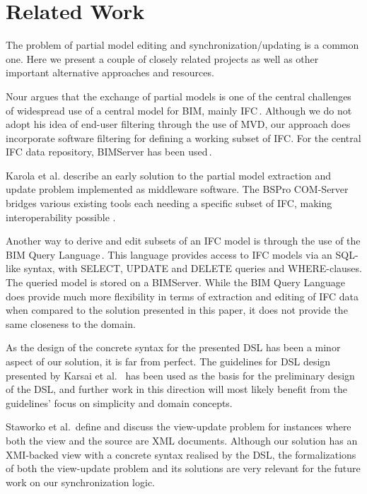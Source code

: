 \section{Related Work}
The problem of partial model editing and synchronization/updating is a common one. Here we present a couple of closely related projects as well as other important alternative approaches and resources.

Nour argues that the exchange of partial models is one of the central challenges of widespread use of a central model for BIM, mainly IFC\,\cite{nour08}. Although we do not adopt his idea of end-user filtering through the use of MVD, our approach does incorporate software filtering for defining a working subset of IFC. For the central IFC data repository, BIMServer has been used\,\cite{beetz10}.

Karola et al. describe an early solution to the partial model extraction and update problem implemented as middleware software. The BSPro COM-Server bridges various existing tools each needing a specific subset of IFC, making interoperability possible \cite{karola02}.

Another way to derive and edit subsets of an IFC model is through the use of the BIM Query Language\,\cite{mazairac10}. This language provides access to IFC models via an SQL-like syntax, with SELECT, UPDATE and DELETE queries and WHERE-clauses. The queried model is stored on a BIMServer. While the BIM Query Language does provide much more flexibility in terms of extraction and editing of IFC data when compared to the solution presented in this paper, it does not provide the same closeness to the domain.

As the design of the concrete syntax for the presented DSL has been a minor aspect of our solution, it is far from perfect. The guidelines for DSL design presented by Karsai et al. \,\cite{karsai09} has been used as the basis for the preliminary design of the DSL, and further work in this direction will most likely benefit from the guidelines' focus on simplicity and domain concepts.

Staworko et al.\,\cite{staworko10} define and discuss the view-update problem for instances where both the view and the source are XML documents. Although our solution has an XMI-backed view with a concrete syntax realised by the DSL, the formalizations of both the view-update problem and its solutions are very relevant for the future work on our synchronization logic.


